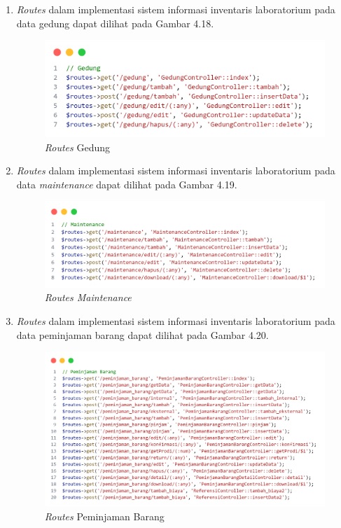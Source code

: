 \begin{enumerate}
  \item \textit{Routes} dalam implementasi sistem informasi inventaris laboratorium pada data gedung dapat dilihat pada Gambar 4.18.

        \begin{figure}
          \centering
          \includegraphics[width=0.82\linewidth]{konten//gambar/routes gedung.png}
          \caption{\textit{Routes} Gedung}
          \label{fig:enter-label}
        \end{figure}

  \item \textit{Routes} dalam implementasi sistem informasi inventaris laboratorium pada data \textit{maintenance} dapat dilihat pada Gambar 4.19.

        \begin{figure}
          \centering
          \includegraphics[width=0.82\linewidth]{konten//gambar/routes maintenance.png}
          \caption{\textit{Routes Maintenance}}
          \label{fig:enter-label}
        \end{figure}

  \item \textit{Routes} dalam implementasi sistem informasi inventaris laboratorium pada data peminjaman barang dapat dilihat pada Gambar 4.20.

        \begin{figure}
          \centering
          \includegraphics[width=0.82\linewidth]{konten//gambar/routes peminjaman barang.png}
          \caption{\textit{Routes} Peminjaman Barang}
          \label{fig:enter-label}
        \end{figure}


\end{enumerate}
